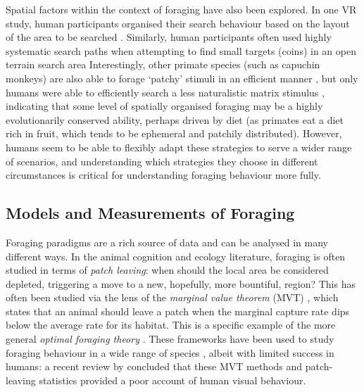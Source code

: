 \documentclass[man, floatsintext]{apa7}
\begin{document}
Spatial factors within the context of foraging have also been explored. In one VR study, human participants organised their search behaviour based on the layout of the area to be searched \citep{de2014spatial}. Similarly, human participants often used highly systematic search paths when attempting to find small targets (coins) in an open terrain search area \citep{riggs2017importance} Interestingly, other primate species (such as capuchin monkeys) are also able to forage `patchy' stimuli in an efficient manner \citep{de1997organization}, but only humans were able to efficiently search a less naturalistic matrix stimulus \citep{de2014spatial}, indicating that some level of spatially organised foraging may be a highly evolutionarily conserved ability, perhaps driven by diet \citep{smith2022sources} (as primates eat a diet rich in fruit, which tends to be ephemeral and patchily distributed). However, humans seem to be able to flexibly adapt these strategies to serve a wider range of scenarios, and understanding which strategies they choose in different circumstances is critical for understanding foraging behaviour more fully.

\subsection{Models and Measurements of Foraging}

Foraging paradigms are a rich source of data and can be analysed in many different ways. In the animal cognition and ecology literature, foraging is often studied in terms of \textit{patch leaving}: when should the local area be considered depleted, triggering a move to a new, hopefully, more bountiful, region? This has often been studied via the lens of the \textit{marginal value theorem} (MVT) \citep{charnov1976}, which states that an animal should leave a patch when the marginal capture rate dips below the average rate for its habitat. This is a specific example of the more general \textit{optimal foraging theory} \citep{pyke1977optimal}. These frameworks have been used to study foraging behaviour in a wide range of species \citep{bella2021}, albeit with limited success in humans: a recent review by \cite{kristjansson2025} concluded that these MVT methods and patch-leaving statistics provided a poor account of human visual behaviour. 
\end{document}
